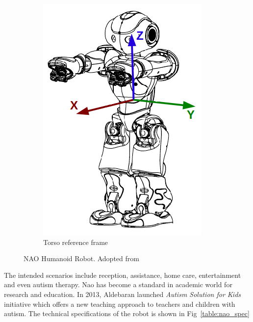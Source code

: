 \begin{figure}[H]
\begin{subfigure}[b]{0.25\textwidth}
\includegraphics[width=\textwidth]{assets/hardware_inertialunit1.png}
\caption{Torso reference frame}
\label{fig:naoreference}
\end{subfigure}
\caption[NAO Humanoid Robot]{NAO Humanoid Robot. {Adopted from \cite{NaoTheRobot}}}
\label{fig:naorobot}
\end{figure}%
The intended scenarios include reception, assistance, home care, entertainment and even autism therapy. Nao has become a standard in academic world for research and education. In 2013, Aldebaran launched \emph{Autism Solution for Kids} \cite{ASKNao} initiative which offers a new teaching approach to teachers and children with autism. The technical specifications of the robot is shown in Fig~\ref{table:nao_spec}
